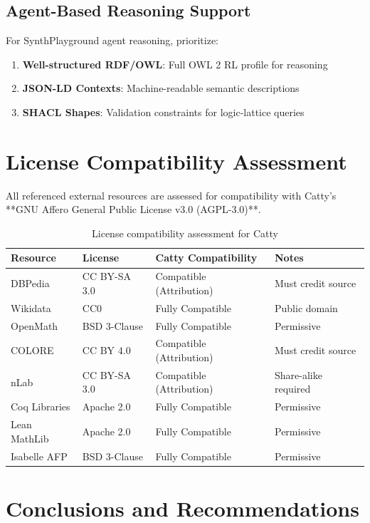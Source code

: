 \subsection{Agent-Based Reasoning Support}

For SynthPlayground agent reasoning, prioritize:

\begin{enumerate}
  \item \textbf{Well-structured RDF/OWL}: Full OWL 2 RL profile for reasoning
  \item \textbf{JSON-LD Contexts}: Machine-readable semantic descriptions
  \item \textbf{SHACL Shapes}: Validation constraints for logic-lattice queries
\end{enumerate}

\section{License Compatibility Assessment}

All referenced external resources are assessed for compatibility with Catty's **GNU Affero General Public License v3.0 (AGPL-3.0)**.

\begin{table}[h]
\centering
\begin{tabular}{|l|l|l|l|}
\hline
\textbf{Resource} & \textbf{License} & \textbf{Catty Compatibility} & \textbf{Notes} \\
\hline
DBPedia & CC BY-SA 3.0 & Compatible (Attribution) & Must credit source \\
Wikidata & CC0 & Fully Compatible & Public domain \\
OpenMath & BSD 3-Clause & Fully Compatible & Permissive \\
COLORE & CC BY 4.0 & Compatible (Attribution) & Must credit source \\
nLab & CC BY-SA 3.0 & Compatible (Attribution) & Share-alike required \\
Coq Libraries & Apache 2.0 & Fully Compatible & Permissive \\
Lean MathLib & Apache 2.0 & Fully Compatible & Permissive \\
Isabelle AFP & BSD 3-Clause & Fully Compatible & Permissive \\
\hline
\end{tabular}
\caption{License compatibility assessment for Catty}
\end{table}

\section{Conclusions and Recommendations}

